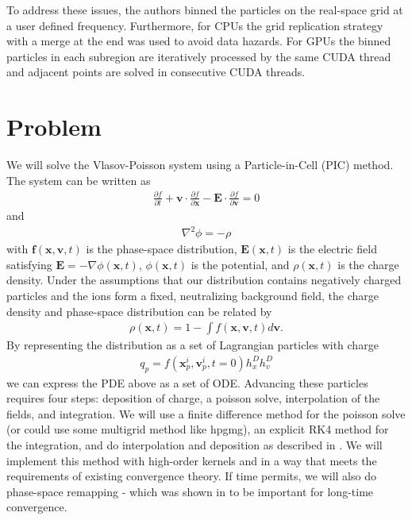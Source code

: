 \documentclass[aps,12pt]{revtex4-1}
\def\b{\mathbf}\def\e{\epsilon}
\def\f{\b{f}}
\renewcommand{\=}[1]{\overline{#1}}
\newcommand{\pder}[2]{\frac{\partial{#1}}{\partial{#2}}}
\begin{document}
To address these issues, the authors binned the particles on the real-space grid at a user defined frequency. Furthermore, for CPUs the grid replication strategy with a merge at the end was used to avoid data hazards. For GPUs the binned particles in each subregion are iteratively processed by the same CUDA thread and adjacent points are solved in consecutive CUDA threads. 



\renewcommand{\refname}{\normalsize\textbf References}
{}


\newpage

\section{Problem}
We will solve the Vlasov-Poisson system using a Particle-in-Cell (PIC) method. The system can be written as
\begin{align*}
\pder{f}{t} + \pmb{v} \cdot \pder{f}{\pmb{x}} - \pmb{E} \cdot \pder{f}{\pmb{v}} = 0
\end{align*}
and 
\begin{align*}
\nabla^2 \phi = -\rho
\end{align*}
with $\f(\pmb{x}, \pmb{v}, t)$ is the phase-space distribution, $\pmb{E}(\pmb{x}, t)$ is the electric field satisfying $\pmb{E} = -\nabla \phi(\pmb{x}, t)$, $\phi(\pmb{x}, t)$ is the potential, and $\rho(\pmb{x}, t)$ is the charge density. Under the assumptions that our distribution contains negatively charged particles and the ions form a fixed, neutralizing background field, the charge density and phase-space distribution can be related by 
\begin{align*}
\rho(\pmb{x}, t) = 1 - \int f(\pmb{x}, \pmb{v}, t) d\pmb{v}. 
\end{align*}
By representing the distribution as a set of Lagrangian particles with charge 
\begin{align*}
q_p = f(\pmb{x}_p^i, \pmb{v}_p^i, t = 0) h_x^D h_v^D
\end{align*}
we can express the PDE above as a set of ODE. Advancing these particles requires four steps: deposition of charge, a poisson solve, interpolation of the fields, and integration. We will use a finite difference method for the poisson solve (or could use some multigrid method like hpgmg), an explicit RK4 method for the integration, and do interpolation and deposition as described in \cite{myers2016convergence}. We will implement this method with high-order kernels and in a way that meets the requirements of existing convergence theory. 
If time permits, we will also do phase-space remapping - which was shown in \cite{wang2011particle} to be important for long-time convergence. 
\end{document}

